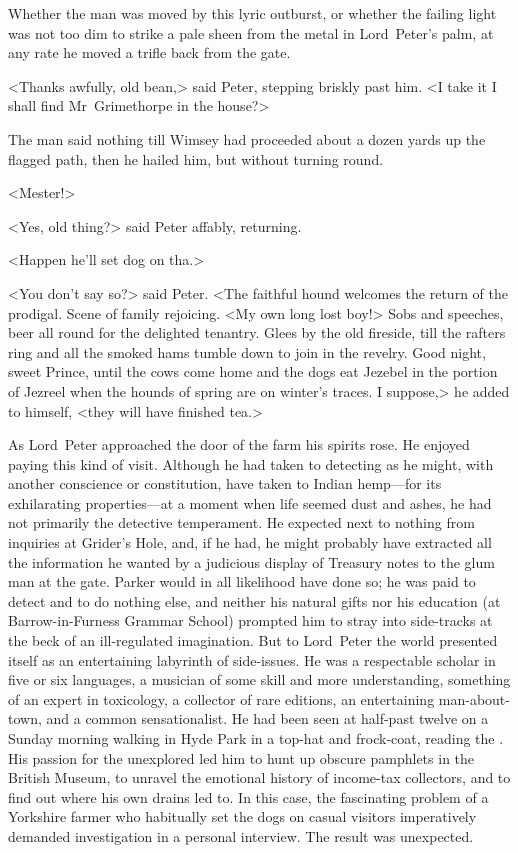 Whether the man was moved by this lyric outburst, or whether the failing light was not too dim to strike a pale sheen from the metal in Lord~Peter's palm, at any rate he moved a trifle back from the gate.

<Thanks awfully, old bean,> said Peter, stepping briskly past him. <I take it I shall find Mr~Grimethorpe in the house?>

The man said nothing till Wimsey had proceeded about a dozen yards up the flagged path, then he hailed him, but without turning round.

<Mester!>

<Yes, old thing?> said Peter affably, returning.

<Happen he'll set dog on tha.>

<You don't say so?> said Peter. <The faithful hound welcomes the return of the prodigal. Scene of family rejoicing. <My own long lost boy!> Sobs and speeches, beer all round for the delighted tenantry. Glees by the old fireside, till the rafters ring and all the smoked hams tumble down to join in the revelry. Good night, sweet Prince, until the cows come home and the dogs eat Jezebel in the portion of Jezreel when the hounds of spring are on winter's traces. I suppose,> he added to himself, <they will have finished tea.>

As Lord~Peter approached the door of the farm his spirits rose. He enjoyed paying this kind of visit. Although he had taken to detecting as he might, with another conscience or constitution, have taken to Indian hemp—for its exhilarating properties—at a moment when life seemed dust and ashes, he had not primarily the detective temperament.  He expected next to nothing from inquiries at Grider's Hole, and, if he had, he might probably have extracted all the information he wanted by a judicious display of Treasury notes to the glum man at the gate. Parker would in all likelihood have done so; he was paid to detect and to do nothing else, and neither his natural gifts nor his education (at Barrow-in-Furness Grammar School) prompted him to stray into side-tracks at the beck of an ill-regulated imagination. But to Lord~Peter the world presented itself as an entertaining labyrinth of side-issues. He was a respectable scholar in five or six languages, a musician of some skill and more understanding, something of an expert in toxicology, a collector of rare editions, an entertaining man-about-town, and a common sensationalist. He had been seen at half-past twelve on a Sunday morning walking in Hyde Park in a top-hat and frock-coat, reading the . His passion for the unexplored led him to hunt up obscure pamphlets in the British Museum, to unravel the emotional history of income-tax collectors, and to find out where his own drains led to. In this case, the fascinating problem of a Yorkshire farmer who habitually set the dogs on casual visitors imperatively demanded investigation in a personal interview. The result was unexpected.

